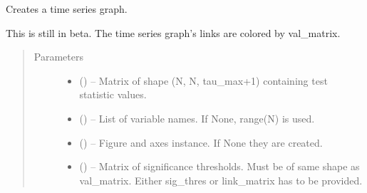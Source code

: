 \documentclass[letterpaper,10pt,english]{sphinxmanual}
\begin{document}
\begin{fulllineitems}
\label{\detokenize{index:tigramite.plotting.plot_time_series_graph}}
Creates a time series graph.

This is still in beta. The time series graph's links are colored by
val\_matrix.
\begin{quote}\begin{description}
\item[{Parameters}] \leavevmode\begin{itemize}
\item {} 
 () -- Matrix of shape (N, N, tau\_max+1) containing test statistic values.

\item {} 
 (\sphinxstyleliteralemphasis{, }\sphinxstyleliteralemphasis{ (}\sphinxstyleliteralemphasis{)}\sphinxstyleliteralemphasis{}) -- List of variable names. If None, range(N) is used.

\item {} 
 (\sphinxstyleliteralemphasis{, }\sphinxstyleliteralemphasis{ (}\sphinxstyleliteralemphasis{)}\sphinxstyleliteralemphasis{}) -- Figure and axes instance. If None they are created.

\item {} 
 (\sphinxstyleliteralemphasis{, }\sphinxstyleliteralemphasis{ (}\sphinxstyleliteralemphasis{)}\sphinxstyleliteralemphasis{}) -- Matrix of significance thresholds. Must be of same shape as  val\_matrix.
Either sig\_thres or link\_matrix has to be provided.


\end{itemize}
\end{description}
\end{quote}
\end{fulllineitems}
\end{document}
